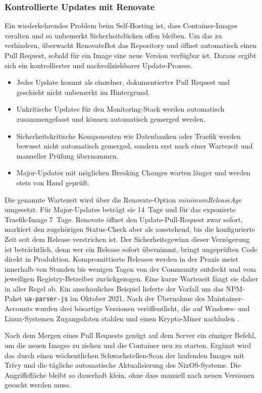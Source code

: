 \subsubsection{Kontrollierte Updates mit Renovate}
\label{sec:renovate}
Ein wiederkehrendes Problem beim Self-Hosting ist, dass Container-Images
veralten und so unbemerkt Sicherheitslücken offen bleiben. Um das zu
verhindern, überwacht RenovateBot das Repository und öffnet automatisch einen
Pull Request, sobald für ein Image eine neue Version verfügbar ist. Daraus
ergibt sich ein kontrollierter und nachvollziehbarer Update-Prozess.

\begin{itemize}
  \item Jedes Update kommt als einzelner, dokumentierter Pull Request und
    geschieht nicht unbemerkt im Hintergrund.
  \item Unkritische Updates für den Monitoring-Stack werden automatisch
    zusammengefasst und können automatisch gemerged werden.
  \item Sicherheitskritische Komponenten wie Datenbanken oder Traefik werden
    bewusst nicht automatisch gemerged, sondern erst nach einer Wartezeit und
    manueller Prüfung übernommen.
  \item Major-Updates mit möglichen Breaking Changes warten länger und werden
    stets von Hand geprüft.
\end{itemize}

Die genannte Wartezeit wird über die Renovate-Option
\textit{minimumReleaseAge} umgesetzt. Für Major-Updates beträgt sie 14~Tage
und für das exponierte Traefik-Image 7~Tage. Renovate öffnet den
Update-Pull-Request zwar sofort, markiert den zugehörigen Status-Check aber
als ausstehend, bis die konfigurierte Zeit seit dem Release verstrichen ist.
Der Sicherheitsgewinn dieser Verzögerung ist beträchtlich, denn wer ein
Release sofort übernimmt, bringt ungeprüften Code direkt in Produktion.
Kompromittierte Releases werden in der Praxis meist innerhalb von Stunden bis
wenigen Tagen von der Community entdeckt und vom jeweiligen
Registry-Betreiber zurückgezogen. Eine kurze Wartezeit fängt sie daher in
aller Regel ab. Ein anschauliches Beispiel lieferte der Vorfall um das
NPM-Paket \texttt{ua-parser-js} im Oktober 2021. Nach der Übernahme des
Maintainer-Accounts wurden drei bösartige Versionen veröffentlicht, die auf
Windows- und Linux-Systemen Zugangsdaten stahlen und einen Krypto-Miner
nachluden \cite{cisa_ua_parser_js_2021}.

Nach dem Mergen eines Pull Requests genügt auf dem Server ein einziger
Befehl, um die neuen Images zu ziehen und die Container neu zu starten.
Ergänzt wird das durch einen wöchentlichen Schwachstellen-Scan der laufenden
Images mit Trivy und die tägliche automatische Aktualisierung des
NixOS-Systems. Die Angriffsfläche bleibt so dauerhaft klein, ohne dass
manuell nach neuen Versionen gesucht werden muss.


